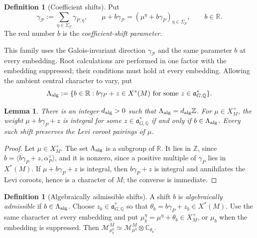\documentclass[12pt]{amsart}
\numberwithin{equation}{section}
\theoremstyle{plain}
\newtheorem{lemma}[theorem]{Lemma}
\theoremstyle{definition}
\newtheorem{definition}[theorem]{Definition}
\theoremstyle{remark}
\newcommand{\cM}{\mathcal M}
\begin{document}
\begin{definition}[Coefficient shifts]\label{def:coefficient-shift}
Put
\[
 \gamma_{\mathcal P}:=\sum_{\eta\in\Sigma_F}\gamma_{P,\eta},
 \qquad
 \mu+b\gamma_{\mathcal P}
        =(\mu^\eta+b\gamma_P)_{\eta\in\Sigma_F},
 \qquad b\in\mathbb R.
\]
The real number $b$ is the \emph{coefficient-shift parameter}.
\end{definition}

This family uses the Galois-invariant direction $\gamma_{\mathcal P}$ and the same parameter $b$ at every embedding. Root calculations are performed in one factor with the embedding suppressed; their conditions must hold at every embedding. Allowing the ambient central character to vary, put 
\begin{equation}\label{eq:lattice}
 \Lambda_{\rm alg}:=
 \{b\in\mathbb R:b\gamma_P+z\in X^*(M)
           \text{ for some }z\in\mathfrak a_{G,\mathbb Q}^*\}.
\end{equation}

\begin{lemma}\label{lem:algebraic-shift-lattice}
There is an integer $d_{\rm alg}>0$ such that $\Lambda_{\rm alg}=d_{\rm alg}\mathbb Z$. For $\mu\in X_M^+$, the weight $\mu+b\gamma_P+z$ is integral for some $z\in\mathfrak a_{G,\mathbb Q}^*$ if and only if $b\in\Lambda_{\rm alg}$. Every such shift preserves the Levi coroot pairings of $\mu$.
\end{lemma}

\begin{proof}
Let $\mu\in X_M^+$. The set $\Lambda_{\rm alg}$ is a subgroup of $\mathbb R$. It lies in $\mathbb Z$, since $b=\langle b\gamma_P+z,\alpha_P^\vee\rangle$, and it is nonzero, since a positive multiple of $\gamma_P$ lies in $X^*(M)$. If $\mu+b\gamma_P+z$ is integral, then $b\gamma_P+z$ is integral and annihilates the Levi coroots, hence is a character of $M$; the converse is immediate.
\end{proof}

\begin{definition}[Algebraically admissible shifts] \label{def:admissible-shift}
A shift $b$ is \emph{algebraically admissible} if $b\in\Lambda_{\rm alg}$. Choose $z_b\in\mathfrak a_{G,\mathbb Q}^*$ so that $\theta_b=b\gamma_P+z_b\in X^*(M)$. Use the same character at every embedding and put $\mu_b^\eta=\mu^\eta+\theta_b\in X_M^+$, or $\mu_b$ when the embedding is suppressed. Then $\cM_{\mu_b^\eta}^M\simeq\cM_{\mu^\eta}^M\otimes\mathbb C_{\theta_b}$.
\end{definition}
\end{document}
